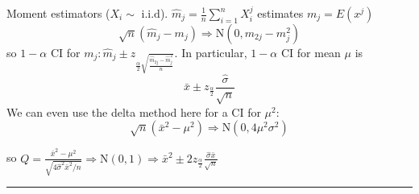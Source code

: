 \documentclass[english, 11pt]{article}
\begin{document}
\begin{exmp}\label{exmp:617}
Moment estimators ($X_i\sim\text{ i.i.d}$). $\hat{m}_j=\frac{1}{n}\sum_{i=1}^n X_i^j$ estimates $m_j=E(x^j)$
$$
\sqrt{n}(\hat{m}_j-m_j)\Rightarrow\text{N}(0, m_{2j}-m_j^2)
$$
so $1-\alpha$ CI for $m_j:\hat{m}_j\pm z_{\frac{\alpha}{2}\sqrt{\frac{\hat{m}_{2j}-\hat{m}_j^2}{n}}}$. In particular, $1-\alpha$ CI for mean $\mu$ is 
$$
\bar{x}\pm z_{\frac{\alpha}{2}}\frac{\hat{\sigma}}{\sqrt{n}}
$$
We can even use the delta method here for a CI for $\mu^2$:
$$
\sqrt{n}(\bar{x}^2-\mu^2)\Rightarrow\text{N}(0, 4\mu^2\sigma^2)
$$

so $Q=\frac{\bar{x}^2-\mu^2}{\sqrt{4\hat{\sigma}^2\bar{x}^2/n}}\Rightarrow\text{N}(0, 1)\Rightarrow\bar{x}^2\pm 2z_{\frac{\alpha}{2}}\frac{\hat{\sigma}\bar{x}}{\sqrt{n}}$
\end{exmp}

\hrule
\bigskip
\end{document}
